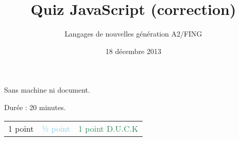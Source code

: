 \documentclass[a4paper, 12pt]{article}
\title{Quiz JavaScript (correction)}
\author{Langages de nouvelles génération A2/FING}
\date{18 décembre 2013}
\newcommand{\fullpoint}[1]{\textcolor{RubineRed}{#1}}
\newcommand{\halfpoint}[1]{\textcolor{SkyBlue}{#1}}
\newcommand{\jedipoint}[1]{\textcolor{SeaGreen}{#1}}
\begin{document}
\maketitle



Sans machine ni document.

Durée : 20 minutes.


\begin{center}
\begin{tabular}{lll}
 \fullpoint{1 point}  &  \halfpoint{½ point}  &  \jedipoint{1 point D.U.C.K}  \\
\end{tabular}
\end{center}
\end{document}
